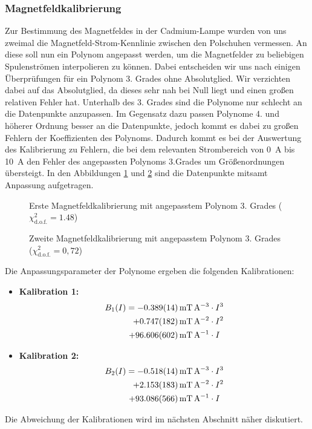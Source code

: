\documentclass[11pt, a4paper]{article}
\begin{document}
\subsubsection{Magnetfeldkalibrierung}
Zur Bestimmung des Magnetfeldes in der Cadmium-Lampe wurden von uns zweimal die Magnetfeld-Strom-Kennlinie zwischen den Polschuhen vermessen.
An diese soll nun ein Polynom angepasst werden, um die Magnetfelder zu beliebigen Spulenströmen interpolieren zu können.
Dabei entscheiden wir uns nach einigen Überprüfungen für ein Polynom 3. Grades ohne Absolutglied.
Wir verzichten dabei auf das Absolutglied, da dieses sehr nah bei Null liegt und einen großen relativen Fehler hat.
Unterhalb des 3. Grades sind die Polynome nur schlecht an die Datenpunkte anzupassen.
Im Gegensatz dazu passen Polynome 4. und höherer Ordnung besser an die Datenpunkte, jedoch kommt es dabei zu großen Fehlern der Koeffizienten des Polynoms.
Dadurch kommt es bei der Auswertung des Kalibrierung zu Fehlern, die bei dem relevanten Strombereich von \SI{0}{\ampere} bis \SI{10}{\ampere} den Fehler des angepassten Polynoms 3.Grades um Größenordnungen übersteigt.
In den Abbildungen \ref{fig:kalibrierung1} und \ref{fig:kalibrierung2} sind die Datenpunkte mitsamt Anpassung aufgetragen.
\begin{figure}[h]
\centering

\caption{Erste Magnetfeldkalibrierung mit angepasstem Polynom 3. Grades ($\chi_\mathrm{d.o.f.}^2= \num{1,48}$)}
\label{fig:kalibrierung1}
\end{figure}
\begin{figure}[h]
\centering

\caption{Zweite Magnetfeldkalibrierung mit angepasstem Polynom 3. Grades ($\chi_\mathrm{d.o.f.}^2=0,72$)}
\label{fig:kalibrierung2}
\end{figure}
Die Anpassungsparameter der Polynome ergeben die folgenden Kalibrationen:
\begin{itemize}
	\item \textbf{Kalibration 1:}
	\begin{align*}
	B_1(I) = \SI{-0.389 +- 0.014}{\milli\tesla\per\ampere\cubed} &\cdot I^3 \nonumber\\
	+\SI{0.747+-0.182}{\milli\tesla\per\ampere\squared} &\cdot I^2 \nonumber\\
	+ \SI{96.606 +- 0.602}{\milli\tesla\per\ampere} &\cdot I
	\end{align*}
	\item \textbf{Kalibration 2:}
	\begin{align*}
	B_2(I) = \SI{-0.518 +- 0.014}{\milli\tesla\per\ampere\cubed} &\cdot I^3 \nonumber\\
	+\SI{2.153+-0.183}{\milli\tesla\per\ampere\squared} &\cdot I^2 \nonumber\\
	+ \SI{93.086 +- 0.566}{\milli\tesla\per\ampere} &\cdot I
	\end{align*}
\end{itemize}
Die Abweichung der Kalibrationen wird im nächsten Abschnitt näher diskutiert.
\end{document}
